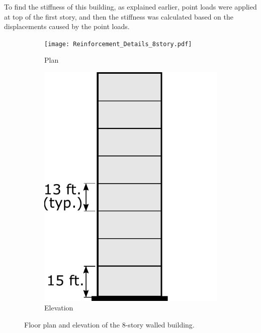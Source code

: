 \documentclass{simcenterdocumentation}
\begin{document}
To find the stiffness of this building, as explained earlier, point loads were applied at top of the first story, and then the stiffness was calculated based on the displacements caused by the point loads.

\begin{figure}[H]
	\begin{subfigure}[b]{0.7\linewidth}
		\centering \texttt{[image: Reinforcement\_Details\_8story.pdf]}
		\caption{Plan}	
	\end{subfigure}
	\begin{subfigure}[b]{0.25\linewidth}
		\centering \includegraphics[scale=0.5]{bldg_elevations.pdf}
		\caption{Elevation}
	\end{subfigure}
	\caption{Floor plan and elevation of the 8-story walled building.}
	\label{fig:8_floor_plan}
\end{figure}
\end{document}
